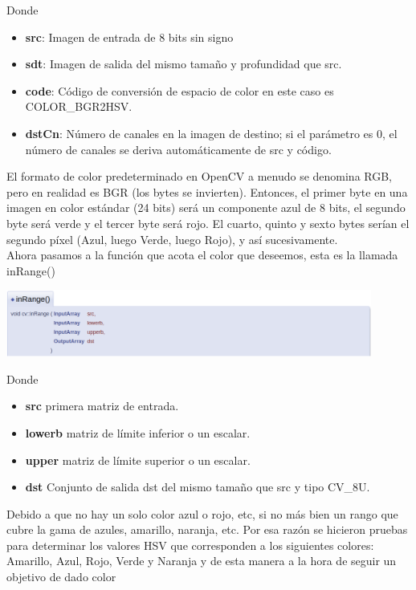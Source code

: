 Donde
\begin{itemize}
	\item \textbf{src}: Imagen de entrada de 8 bits sin signo
	\item \textbf{sdt}: Imagen de salida del mismo tamaño y profundidad que src.
	\item \textbf{code}: Código de conversión de espacio de color en este caso es \\COLOR\_BGR2HSV.
	\item \textbf{dstCn}: Número de canales en la imagen de destino; si el parámetro es 0, el
	      número de canales se deriva automáticamente de src y código.
\end{itemize}

El formato de color predeterminado en OpenCV a menudo se denomina RGB, pero en realidad
es BGR (los bytes se invierten). Entonces, el primer byte en una imagen en color estándar
(24 bits) será un componente azul de 8 bits, el segundo byte será verde y el tercer
byte será rojo. El cuarto, quinto y sexto bytes serían el segundo píxel (Azul, luego
Verde, luego Rojo), y así sucesivamente.\\
Ahora pasamos a la función que acota el color que deseemos, esta es la llamada inRange()
\begin{center}
	\includegraphics[width=0.9\textwidth]{Contenido/Cuerpo/Capitulo4/Fig3.eps}
	\label{Fig6}
\end{center}
Donde
\begin{itemize}
	\item \textbf{src} primera matriz de entrada.
	\item \textbf{lowerb} matriz de límite inferior o un escalar.
	\item \textbf{upper}  matriz de límite superior o un escalar.
	\item \textbf{dst} Conjunto de salida dst del mismo tamaño que src y tipo CV\_8U.
\end{itemize}
Debido a que no hay un solo color azul o rojo, etc, si no más bien un rango que cubre
la gama de azules, amarillo, naranja, etc. Por esa razón se hicieron pruebas para
determinar los valores HSV que corresponden a los siguientes colores: Amarillo, Azul,
Rojo, Verde y Naranja y de esta manera a la hora de seguir un objetivo de dado color
